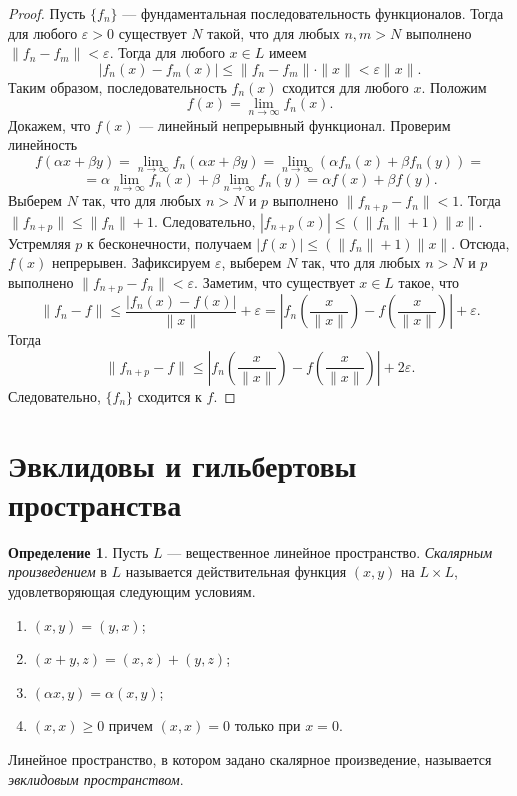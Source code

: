 \documentclass[12pt, titlepage, oneside]{amsbook}
\theoremstyle{definition}
\newtheorem{definition}[theorem]{Определение}
\theoremstyle{remark}
\begin{document}
\begin{proof}
Пусть $\{f_n\}$ --- фундаментальная последовательность функционалов. Тогда для любого $\varepsilon>0$ существует $N$ такой, что для любых $n,m>N$ выполнено $\|f_n-f_m\|<\varepsilon$. Тогда для любого $x\in L$ имеем $$|f_n(x)-f_m(x)|\leq\|f_n-f_m\|\cdot\|x\|<\varepsilon \|x\|.$$ Таким образом, последовательность $f_n(x)$ сходится для любого $x$. Положим $$f(x)=\lim\limits_{n\rightarrow\infty} f_n(x).$$ Докажем, что $f(x)$ --- линейный непрерывный функционал. Проверим линейность $$f(\alpha x+\beta y)=\lim\limits_{n\rightarrow\infty} f_n(\alpha x+\beta y)=\lim\limits_{n\rightarrow\infty} (\alpha f_n(x)+\beta f_n(y))=$$ $$=\alpha\lim\limits_{n\rightarrow\infty} f_n(x)+\beta\lim\limits_{n\rightarrow\infty} f_n(y)=\alpha f(x)+\beta f(y).$$ Выберем $N$ так, что для любых $n>N$ и $p$ выполнено $\|f_{n+p}-f_n\|<1$. Тогда $\|f_{n+p}\|\leq\|f_n\|+1.$ Следовательно, $|f_{n+p}(x)|\leq(\|f_n\|+1)\|x\|.$ Устремляя $p$ к бесконечности, получаем $|f(x)|\leq(\|f_n\|+1)\|x\|$. Отсюда, $f(x)$ непрерывен. Зафиксируем $\varepsilon$, выберем $N$ так, что для любых $n>N$ и $p$ выполнено $\|f_{n+p}-f_n\|<\varepsilon$. Заметим, что существует $x\in L$ такое, что $$\|f_n-f\|\leq\frac{|f_n(x)-f(x)|}{\|x\|}+\varepsilon=\left|f_n\left(\frac{x}{\|x\|}\right)-f\left(\frac{x}{\|x\|}\right)\right|+\varepsilon.$$ Тогда $$\|f_{n+p}-f\|\leq\left|f_n\left(\frac{x}{\|x\|}\right)-f\left(\frac{x}{\|x\|}\right)\right|+2\varepsilon.$$ Следовательно, $\{f_n\}$ сходится к $f$.
\end{proof}

\section{Эвклидовы и гильбертовы пространства}


\begin{definition}
Пусть $L$ --- вещественное линейное пространство. \emph{Скалярным произведением} в $L$ называется действительная функция $(x,y)$ на $L\times L$, удовлетворяющая следующим условиям.
\begin{enumerate}
\item $(x,y)=(y,x)$;
\item $(x+y,z)=(x,z)+(y,z)$;
\item $(\alpha x,y)=\alpha (x,y)$;
\item $(x,x)\geq 0$ причем $(x,x)=0$ только при $x=0$.
\end{enumerate}
Линейное пространство, в котором задано скалярное произведение, называется \emph{эвклидовым пространством}.
\end{definition}
\end{document}
